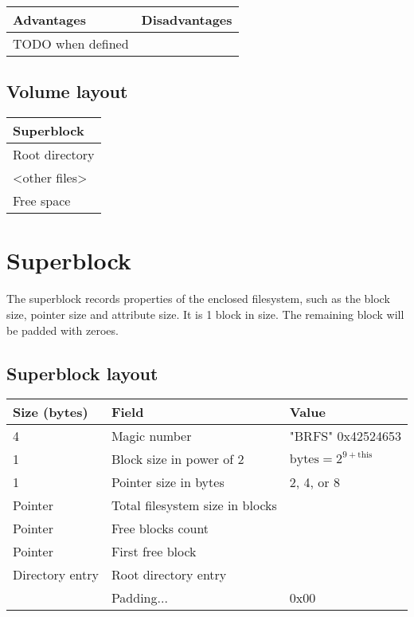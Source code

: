 \documentclass[]{article}
\begin{document}
	\begin{tabularx}{\textwidth}{X|X}
		\textbf{Advantages} & \textbf{Disadvantages} \\
		\hline
		TODO when defined
	\end{tabularx}

	\subsection{Volume layout}

	\begin{tabular}{|l|}
		\hline
		Superblock \\
		\hline
		Root directory \\
		\hline
		\textless other files\textgreater \\
		\hline
		Free space \\
		\hline
	\end{tabular}

	\section{Superblock}

	The superblock records properties of the enclosed filesystem, such as the block size, pointer size and attribute size. It is 1 block in size. The remaining block will be padded with zeroes.

	\subsection{Superblock layout}

	\begin{tabular}{|l|l|l|}
		\hline
		\textbf{Size (bytes)} & \textbf{Field} & \textbf{Value} \\ [0.5ex]
		\hline
		4 & Magic number & "BRFS" 0x42524653  \\
		\hline
		1 & Block size in power of 2 & $ \textrm{bytes} = 2^{9 + \textrm{this}}$ \\
		\hline
		1 & Pointer size in bytes & 2, 4, or 8 \\
		\hline
		Pointer & Total filesystem size in blocks & \\
		\hline
		Pointer & Free blocks count & \\
		\hline
		Pointer & First free block & \\
		\hline
		Directory entry & Root directory entry & \\
		\hline
		 & Padding... & 0x00 \\
		\hline
	\end{tabular}
\end{document}
